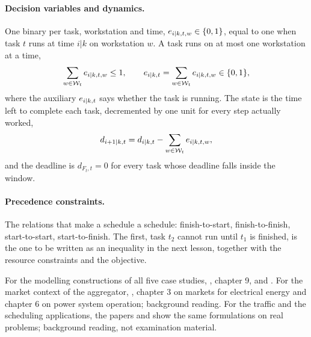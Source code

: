 \paragraph{Decision variables and dynamics.} One binary per task, workstation and time,
$e_{{i|k},t,w} \in \{0,1\}$, equal to one when task $t$ runs at time $i|k$ on workstation $w$.
A task runs on at most one workstation at a time,
\begin{equation}
  \sum_{w \in \mathcal{W}_t} e_{{i|k},t,w} \le 1, \qquad
  e_{{i|k},t} = \sum_{w \in \mathcal{W}_t} e_{{i|k},t,w} \in \{0,1\},
\end{equation}
where the auxiliary $e_{{i|k},t}$ says whether the task is running. The state is the time left
to complete each task, decremented by one unit for every step actually worked,
\begin{equation}
  d_{{i+1|k},t} = d_{{i|k},t} - \sum_{w \in \mathcal{W}_t} e_{{i|k},t,w},
\end{equation}
and the deadline is $d_{F_t,t} = 0$ for every task whose deadline falls inside the window.

\paragraph{Precedence constraints.} The relations that make a schedule a schedule:
finish-to-start, finish-to-finish, start-to-start, start-to-finish. The first, task $t_2$ cannot
run until $t_1$ is finished, is the one to be written as an inequality in the next lesson,
together with the resource constraints and the objective.

\begin{reading}
For the modelling constructions of all five case studies, , chapter 9, and
. For the market context of the aggregator, ,
chapter 3 on markets for electrical energy and chapter 6 on power system operation; background
reading. For the traffic and the scheduling applications, the papers 
and  show the same formulations on real problems; background reading,
not examination material.
\end{reading}
